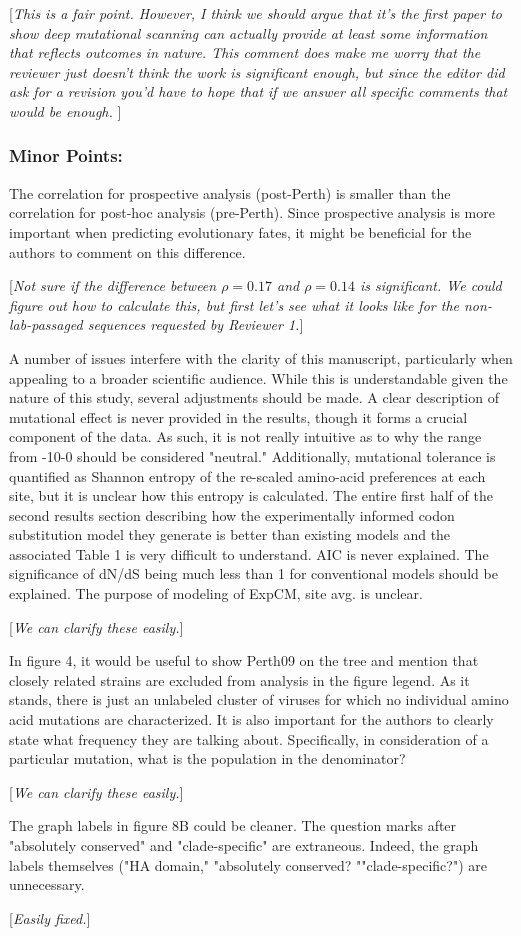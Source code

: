 \documentclass[11pt, oneside]{article}   	%
\newcommand{\comment}[1]{{\color{red}[\textsl{#1}]}}
\begin{document}
\comment{This is a fair point.
However, I think we should argue that it's the first paper to show deep mutational scanning can actually provide at least some information that reflects outcomes in nature.
This comment does make me worry that the reviewer just doesn't think the work is significant enough, but since the editor did ask for a revision you'd have to hope that if we answer all specific comments that would be enough.
}

\subsubsection*{Minor Points:} 

The correlation for prospective analysis (post-Perth) is smaller than the correlation for post-hoc analysis (pre-Perth). Since prospective analysis is more important when predicting evolutionary fates, it might be beneficial for the authors to comment on this difference. 

\comment{Not sure if the difference between $\rho = 0.17$ and $\rho = 0.14$ is significant. 
We could figure out how to calculate this, but first let's see what it looks like for the non-lab-passaged sequences requested by Reviewer 1.}

A number of issues interfere with the clarity of this manuscript, particularly when appealing to a broader scientific audience. While this is understandable given the nature of this study, several adjustments should be made. A clear description of mutational effect is never provided in the results, though it forms a crucial component of the data. As such, it is not really intuitive as to why the range from -10-0 should be considered "neutral." Additionally, mutational tolerance is quantified as Shannon entropy of the re-scaled amino-acid preferences at each site, but it is unclear how this entropy is calculated. The entire first half of the second results section describing how the experimentally informed codon substitution model they generate is better than existing models and the associated Table 1 is very difficult to understand. AIC is never explained. The significance of dN/dS being much less than 1 for conventional models should be explained. The purpose of modeling of ExpCM, site avg. is unclear. 

\comment{We can clarify these easily.}

In figure 4, it would be useful to show Perth09 on the tree and mention that closely related strains are excluded from analysis in the figure legend. As it stands, there is just an unlabeled cluster of viruses for which no individual amino acid mutations are characterized. It is also important for the authors to clearly state what frequency they are talking about. Specifically, in consideration of a particular mutation, what is the population in the denominator? 

\comment{We can clarify these easily.}

The graph labels in figure 8B could be cleaner. The question marks after "absolutely conserved" and "clade-specific" are extraneous. Indeed, the graph labels themselves ("HA domain," "absolutely conserved? ""clade-specific?") are unnecessary. 

\comment{Easily fixed.}
\end{document}
